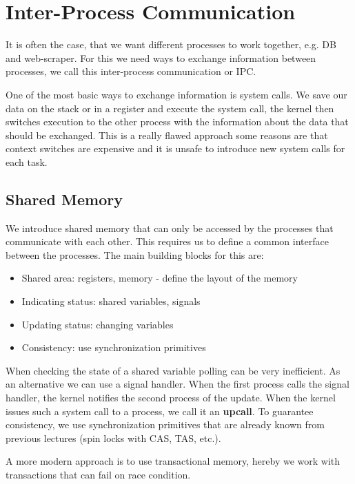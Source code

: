\section{Inter-Process Communication}

It is often the case, that we want different processes to work together, e.g. DB and web-scraper. For this we need ways to exchange information between processes, we call this inter-process communication or IPC.

One of the most basic ways to exchange information is system calls. We save our data on the stack or in a register and execute the system call, the kernel then switches execution to the other process with the information about the data that should be exchanged. This is a really flawed approach some reasons are that context switches are expensive and it is unsafe to introduce new system calls for each task.

\subsection{Shared Memory}

We introduce shared memory that can only be accessed by the processes that communicate with each other. This requires us to define a common interface between the processes. The main building blocks for this are:
\begin{itemize}
	\item Shared area: registers, memory - define the layout of the memory
	\item Indicating status: shared variables, signals
	\item Updating status: changing variables
	\item Consistency: use synchronization primitives
\end{itemize}

When checking the state of a shared variable polling can be very inefficient. As an alternative we can use a signal handler. When the first process calls the signal handler, the kernel notifies the second process of the update. When the kernel issues such a system call to a process, we call it an \textbf{upcall}. To guarantee consistency, we use synchronization primitives that are already known from previous lectures (spin locks with CAS, TAS, etc.).

A more modern approach is to use transactional memory, hereby we work with transactions that can fail on race condition.